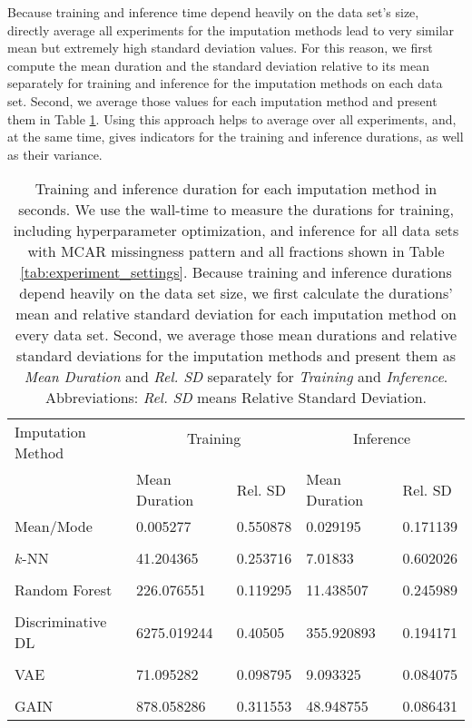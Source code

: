 Because training and inference time depend heavily on the data set's size, directly average all experiments for the imputation methods lead to very similar mean but extremely high standard deviation values. For this reason, we first compute the mean duration and the standard deviation relative to its mean separately for training and inference for the imputation methods on each data set. Second, we average those values for each imputation method and present them in Table \ref{tab:time}. Using this approach helps to average over all experiments, and, at the same time, gives indicators for the training and inference durations, as well as their variance.
%
\begin{table}
	\centering
	\begin{tabular}{@{\extracolsep{4pt}}lllll@{}}
		\toprule
		\multirow{2}{*}{Imputation Method} & \multicolumn{2}{c}{Training} & \multicolumn{2}{c}{Inference} \\\cline{2-3}\cline{4-5}
		\\[-0.75em]
		& Mean Duration &   Rel. SD & Mean Duration &   Rel. SD \\
		\midrule
		Mean/Mode &      0.005277 &  0.550878 &      0.029195 &  0.171139 \\
		\\[-0.5em]
		$k$-NN &     41.204365 &  0.253716 &       7.01833 &  0.602026 \\
		\\[-0.5em]
		Random Forest &    226.076551 &  0.119295 &     11.438507 &  0.245989 \\
		\\[-0.5em]
		Discriminative DL &   6275.019244 &   0.40505 &    355.920893 &  0.194171 \\
		\\[-0.5em]
		VAE &     71.095282 &  0.098795 &      9.093325 &  0.084075 \\
		\\[-0.5em]
		GAIN &    878.058286 &  0.311553 &     48.948755 &  0.086431 \\
		\bottomrule
	\end{tabular}
	\caption{Training and inference duration for each imputation method in seconds. We use the wall-time to measure the durations for training, including hyperparameter optimization, and inference for all data sets with MCAR missingness pattern and all fractions shown in Table \ref{tab:experiment_settings}. Because training and inference durations depend heavily on the data set size, we first calculate the durations' mean and relative standard deviation for each imputation method on every data set. Second, we average those mean durations and relative standard deviations for the imputation methods and present them as \emph{Mean Duration} and \emph{Rel. SD} separately for \emph{Training} and \emph{Inference}. Abbreviations: \emph{Rel. SD} means Relative Standard Deviation.}
	\label{tab:time}
\end{table}

